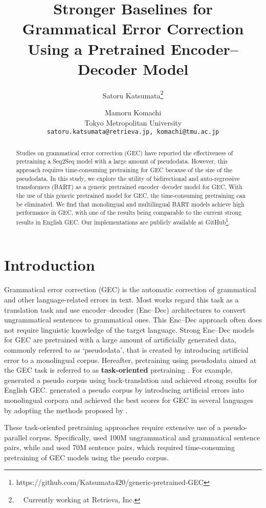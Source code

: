 \documentclass[11pt,a4paper]{article}
\title{Stronger Baselines for Grammatical Error Correction \\ Using a Pretrained Encoder--Decoder Model}
\author{Satoru Katsumata\thanks{\ \ Currently working at Retrieva, Inc.} \and Mamoru Komachi\\
  Tokyo Metropolitan University \\
  \texttt{satoru.katsumata@retrieva.jp, komachi@tmu.ac.jp}
  }
\date{}
\begin{document}
\maketitle
\begin{abstract}
    Studies on grammatical error correction (GEC) have reported the effectiveness of pretraining a Seq2Seq model with a large amount of pseudodata.
However, this approach requires time-consuming pretraining for GEC because of the size of the pseudodata.
    In this study, we explore the utility of bidirectional and auto-regressive transformers (BART) as a generic pretrained encoder--decoder model for GEC.
    With the use of this generic pretrained model for GEC, the time-consuming pretraining can be eliminated.
    We find that monolingual and multilingual BART models achieve high performance in GEC, with one of the results being comparable to the current strong results in English GEC.
    Our implementations are publicly available at GitHub\footnote{https://github.com/Katsumata420/generic-pretrained-GEC}.
\end{abstract}

\section{Introduction}
Grammatical error correction (GEC) is the automatic correction of grammatical and other language-related errors in text.
Most works regard this task as a translation task and use encoder--decoder (Enc--Dec) architectures to convert ungrammatical sentences to grammatical ones.
This Enc--Dec approach often does not require linguistic knowledge of the target language.
Strong Enc--Dec models for GEC are pretrained with a large amount of artificially generated data, commonly referred to as `pseudodata', that is created by introducing artificial error to a monolingual corpus.
Hereafter, pretraining using pseudodata aimed at the GEC task is referred to as \textbf{task-oriented} pretraining \cite{kiyono2019,beasota,low_resource_gec,kaneko_bert}.
For example, \citet{kiyono2019} generated a pseudo corpus using back-translation and achieved strong results for English GEC.
\citet{low_resource_gec} generated a pseudo corpus by introducing artificial errors into monolingual corpora and achieved the best scores for GEC in several languages by adopting the methods proposed by \citet{beasota}.

These task-oriented pretraining approaches require extensive use of a pseudo-parallel corpus.
Specifically, \citet{beasota} used 100M ungrammatical and grammatical sentence pairs, while \citet{kiyono2019} and \citet{kaneko_bert} used 70M sentence pairs,
 which required time-consuming pretraining of GEC models using the pseudo corpus.
\end{document}
